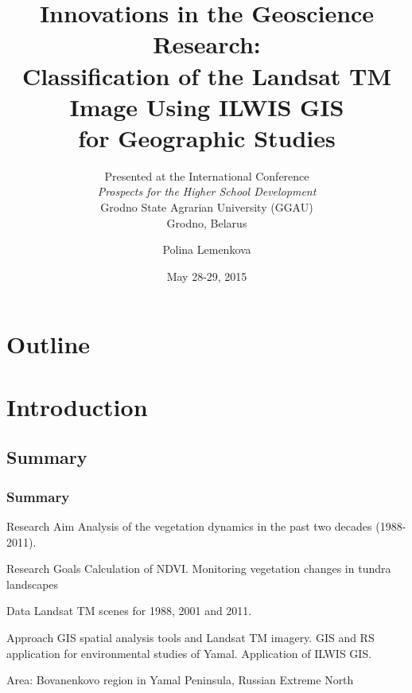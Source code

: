 \documentclass[pdflatex,compress,8pt,
	xcolor={dvipsnames,dvipsnames,svgnames,x11names,table},
	hyperref={colorlinks = true,breaklinks = true, urlcolor = NavyBlue, breaklinks = true}]{beamer}
\title[Innovations in the Geoscience Research: Classification of the Landsat TM]{
Innovations in the Geoscience Research: \\
Classification of the Landsat TM Image Using ILWIS GIS\\
for Geographic Studies }
\subtitle{Presented at the \nth{8} International Conference\\
\emph{Prospects for the Higher School Development}\\
Grodno State Agrarian University (GGAU)\\
Grodno, Belarus
}
\author{Polina Lemenkova}
\date{May 28-29, 2015}
\begin{document}
\begin{frame}
           \titlepage
\end{frame}


\section*{Outline}
\begin{frame}
           \tableofcontents
\end{frame}


\section{Introduction}
\subsection{Summary}
\begin{frame}\frametitle{Summary}

\begin{alertblock}{Research Aim}
Analysis of the vegetation dynamics in the past two decades (1988-2011). 
\end{alertblock}

\begin{block}{Research Goals}
Calculation of NDVI. Monitoring vegetation changes in tundra landscapes
\end{block}

\begin{block}{Data}
Landsat TM scenes for 1988, 2001 and 2011. 
\end{block}

\begin{block}{Approach}
GIS spatial analysis tools and Landsat TM imagery. GIS and RS application for environmental studies of Yamal. Application of ILWIS GIS.
\end{block}

\begin{examples}{Area: }
Bovanenkovo region in Yamal Peninsula, Russian Extreme North
\end{examples}

\end{frame}
\end{document}
